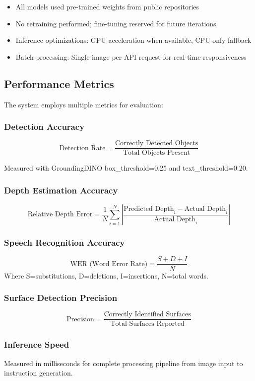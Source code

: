 \documentclass{article}
\begin{document}
\begin{itemize}
    \item All models used pre-trained weights from public repositories
    \item No retraining performed; fine-tuning reserved for future iterations
    \item Inference optimizations: GPU acceleration when available, CPU-only fallback
    \item Batch processing: Single image per API request for real-time responsiveness
\end{itemize}

\subsection{Performance Metrics}

The system employs multiple metrics for evaluation:

\subsubsection{Detection Accuracy}
\[
\text{Detection Rate} = \frac{\text{Correctly Detected Objects}}{\text{Total Objects Present}}
\]

Measured with GroundingDINO box\_threshold=0.25 and text\_threshold=0.20.

\subsubsection{Depth Estimation Accuracy}
\[
\text{Relative Depth Error} = \frac{1}{N}\sum_{i=1}^{N} \left|\frac{\text{Predicted Depth}_i - \text{Actual Depth}_i}{\text{Actual Depth}_i}\right|
\]

\subsubsection{Speech Recognition Accuracy}
\[
\text{WER (Word Error Rate)} = \frac{S + D + I}{N}
\]
Where S=substitutions, D=deletions, I=insertions, N=total words.

\subsubsection{Surface Detection Precision}
\[
\text{Precision} = \frac{\text{Correctly Identified Surfaces}}{\text{Total Surfaces Reported}}
\]

\subsubsection{Inference Speed}
Measured in milliseconds for complete processing pipeline from image input to instruction generation.
\end{document}
